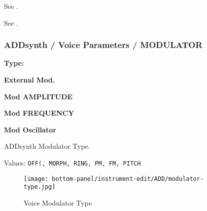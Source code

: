    See .

   See .

\subsubsection{ADDsynth / Voice Parameters / MODULATOR}
\label{subsubsec:addsynth_voice_parameters_modulator}

   \begin{enumber}
      \item \textbf{Type:}
      \item \textbf{External Mod.}
      \item \textbf{Mod AMPLITUDE}
      \item \textbf{Mod FREQUENCY}
      \item \textbf{Mod Oscillator}
   \end{enumber}

   \setcounter{ItemCounter}{0}      %

   ADDsynth Modulator Type.

   Values: \texttt{OFF(, MORPH, RING, PM, FM, PITCH}

\begin{figure}[H]
   \centering 
   \texttt{[image: bottom-panel/instrument-edit/ADD/modulator-type.jpg]}
   \caption{Voice Modulator Type}
   \label{fig:voice_modulator_type}
\end{figure}

